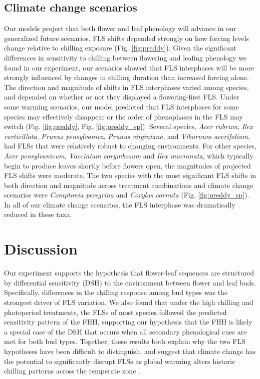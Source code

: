 \documentclass[11pt]{article}\usepackage[]{graphicx}\usepackage[]{color}
\begin{document}
\subsection*{Climate change scenarios}
\noindent Our models project that both flower and leaf phenology will advance in our generalized future scenarios. FLS shifts depended strongly on how forcing levels change relative to chilling exposure (Fig. \ref{fig:preddy}). Given the significant differences in sensitivity to chilling between flowering and leafing phenology we found in our experiment, our scenarios showed that FLS interphases will be more strongly influenced by changes in chilling duration than increased forcing alone.\\ 

\noindent The direction and magnitude of shifts in FLS interphases varied among species, and depended on whether or not they displayed a flowering-first FLS. Under some warming scenarios, our model predicted that  FLS interphases for some species may effectively disappear or the order of phenophases in the FLS may switch (Fig. \ref{fig:preddy}, Fig. \ref{fig:preddy_sp}). Several species, \textit{Acer rubrum}, \textit{Ilex verticillata}, \textit{Prunus pensylvanica}, \textit{Prunus virginiana}, and \textit{Viburnum acerifolium}, had FLSs that were relatively robust to changing environments. For other species, \textit{Acer pensylvanicum}, \textit{Vaccinium corymbosum} and \textit{Ilex mucronata}, which typically begin to produce leaves shortly before flowers open, the magnitudes of projected FLS shifts were moderate. The two species with the most significant FLS shifts in both direction and magnitude across treatment combinations and climate change scenarios were \textit{Comptonia peregrina} and \textit{Corylus cornuta} (Fig. \ref{fig:preddy_sp}). In all of our climate change scenarios, the FLS interphase was dramatically reduced in these taxa.\\

\section*{Discussion}
\noindent Our experiment supports the hypothesis that flower-leaf sequences are structured by differential sensitivity (DSH) to the environment between flower and leaf buds. Specifically, differences in the chilling response among bud types was the strongest driver of FLS variation. We also found that under the high chilling and photoperiod treatments, the FLSs of most species followed the predicted sensitivity pattern of the FHH, supporting our hypothesis that the FHH is likely a special case of the DSH that occurs when all secondary phenological cues are met for both bud types. Together, these results both explain why the two FLS hypotheses have been difficult to distinguish, and suggest that climate change has the potential to significantly disrupt FLSs as global warming alters historic chilling patterns across the temperate zone \citep{Morin:2009aa}. 
\end{document}
